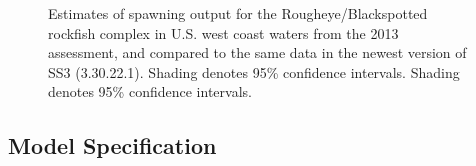 \documentclass[
]{scrartcl}
\begin{document}
\begin{figure}[H]


\caption{\label{fig-SO_2013}Estimates of spawning output for the
Rougheye/Blackspotted rockfish complex in U.S. west coast waters from
the 2013 assessment, and compared to the same data in the newest version
of SS3 (3.30.22.1). Shading denotes 95\% confidence intervals. Shading
denotes 95\% confidence intervals.}

\end{figure}%

\newpage

\subsection{Model Specification}\label{model-specification}
\end{document}
